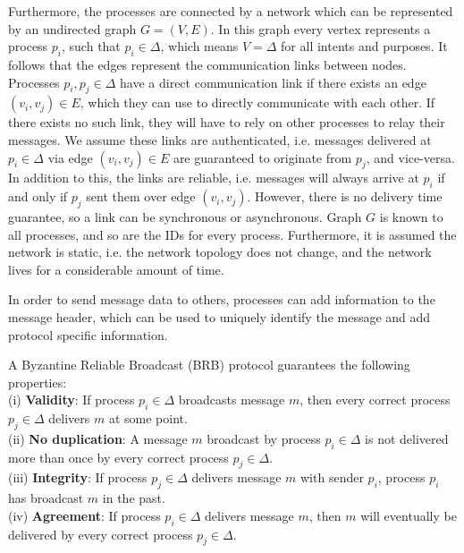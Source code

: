 Furthermore, the processes are connected by a network which can be represented by an undirected graph $G=(V,E)$. In this graph every vertex represents a process $p_i$, such that $p_i \in \Delta$, which means $V=\Delta$ for all intents and purposes. It follows that the edges represent the communication links between nodes.
Processes $p_i, p_j \in \Delta$ have a direct communication link if there exists an edge $(v_i, v_j) \in E$, which they can use to directly communicate with each other. If there exists no such link, they will have to rely on other processes to relay their messages. We assume these links are authenticated, i.e. messages delivered at $p_i \in \Delta$ via edge $(v_i, v_j) \in E$ are guaranteed to originate from $p_j$, and vice-versa. In addition to this, the links are reliable, i.e. messages will always arrive at $p_i$ if and only if $p_j$ sent them over edge $(v_i, v_j)$. However, there is no delivery time guarantee, so a link can be synchronous or asynchronous. Graph $G$ is known to all processes, and so are the IDs for every process. Furthermore, it is assumed the network is static, i.e. the network topology does not change, and the network lives for a considerable amount of time.

In order to send message data to others, processes can add information to the message header, which can be used to uniquely identify the message and add protocol specific information.

A Byzantine Reliable Broadcast (BRB) protocol guarantees the following properties:\\
(i) \textbf{Validity}: If process $p_i \in \Delta$ broadcasts message $m$, then every correct process $p_j \in \Delta$ delivers $m$ at some point.\\
(ii) \textbf{No duplication}: A message $m$ broadcast by process $p_i \in \Delta$ is not delivered more than once by every correct process $p_j \in \Delta$.\\
(iii) \textbf{Integrity}: If process $p_j \in \Delta$ delivers message $m$ with sender $p_i$, process $p_i$ has broadcast $m$ in the past.\\
(iv) \textbf{Agreement}: If process $p_i \in \Delta$ delivers message $m$, then $m$ will eventually be delivered by every correct process $p_j \in \Delta$.



